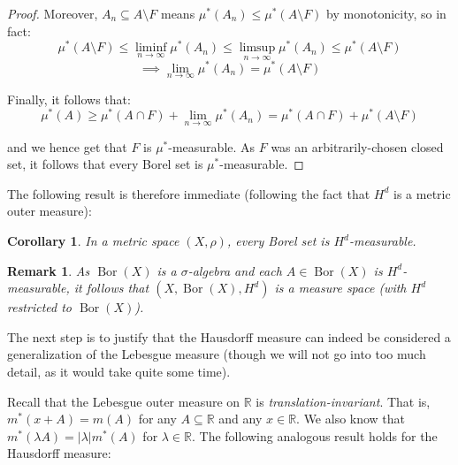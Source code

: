 \documentclass{article}[11pt]
\newcommand*{\R}{\mathbb{R}}
\DeclareMathOperator*{\Bor}{Bor}
\theoremstyle{dotless}
\newtheorem{cor}[thm]{Corollary}
\newtheorem{rem}[thm]{Remark}
\begin{document}
\begin{proof}
	\noindent
	Moreover, $A_n \subseteq A \setminus F$ means $\mu^*(A_n) \leqslant \mu^*(A \setminus F)$ by monotonicity, so in fact:
	\[ \mu^*(A \setminus F) \leqslant \liminf_{n \to \infty} \mu^*(A_n) \leqslant \limsup_{n \to \infty} \mu^*(A_n)
	\leqslant \mu^*(A \setminus F) \]
	\[ \implies \lim_{n \to \infty} \mu^*(A_n) = \mu^*(A \setminus F) \]
	
	\noindent
	Finally, it follows that:
	\[ \mu^*(A) \geqslant \mu^*(A \cap F) + \lim_{n \to \infty} \mu^*(A_n) = \mu^*(A \cap F) + \mu^*(A \setminus F) \]
	
	\noindent
	and we hence get that $F$ is $\mu^*$-measurable. As $F$ was an arbitrarily-chosen closed set, it follows that every Borel set is 
	$\mu^*$-measurable.
\end{proof}

The following result is therefore immediate (following the fact that $H^d$ is a metric outer measure):

\begin{cor}
	In a metric space $(X, \rho)$, every Borel set is $H^d$-measurable.
\end{cor}

\begin{rem}
	As $\Bor(X)$ is a $\sigma$-algebra and each $A \in \Bor(X)$ is $H^d$-measurable, it follows that
	$(X, \Bor(X), H^d)$ is a measure space (with $H^d$ restricted to $\Bor(X)$). 
\end{rem}

The next step is to justify that the Hausdorff measure can indeed be considered a generalization of the Lebesgue
measure (though we will not go into too much detail, as it would take quite some time). 
\bigskip

Recall that the Lebesgue outer measure on $\R$ is \textit{translation-invariant}. That is, $m^*(x + A) = m(A)$ for any $A \subseteq \R$
and any $x \in \R$. We also know that $m^*(\lambda A) = |\lambda| m^*(A)$ for $\lambda \in \R$. 
The following analogous result holds for the Hausdorff measure:
\end{document}
